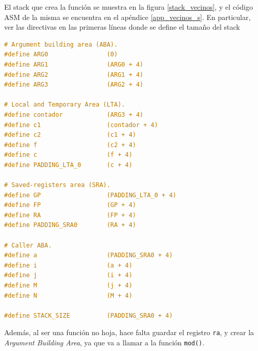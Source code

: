 \documentclass[a4paper,12pt]{article}
\numberwithin{equation}{section}
\numberwithin{figure}{section}
\begin{document}
El stack que crea la función se muestra en la figura \ref{stack_vecinos}, y el código ASM de la misma se encuentra en el apéndice \ref{app_vecinos_s}. En particular, ver las directivas en las primeras líneas donde se define el tamaño del stack
\begin{lstlisting}[language=C, style=StyleC]
# Argument building area (ABA).
#define ARG0                (0)
#define ARG1                (ARG0 + 4)
#define ARG2                (ARG1 + 4)
#define ARG3                (ARG2 + 4)

# Local and Temporary Area (LTA).
#define contador            (ARG3 + 4)
#define c1                  (contador + 4)
#define c2                  (c1 + 4)
#define f                   (c2 + 4)
#define c                   (f + 4)
#define PADDING_LTA_0       (c + 4)

# Saved-registers area (SRA).
#define GP                  (PADDING_LTA_0 + 4)
#define FP                  (GP + 4)
#define RA                  (FP + 4)
#define PADDING_SRA0        (RA + 4)

# Caller ABA.
#define a                   (PADDING_SRA0 + 4)
#define i                   (a + 4)
#define j                   (i + 4)
#define M                   (j + 4)
#define N                   (M + 4)

#define STACK_SIZE          (PADDING_SRA0 + 4)
\end{lstlisting}

Además, al ser una función no hoja, hace falta guardar el registro \texttt{ra}, y crear la \textit{Argument Building Area}, ya que va a llamar a la función \texttt{mod()}.
\end{document}
